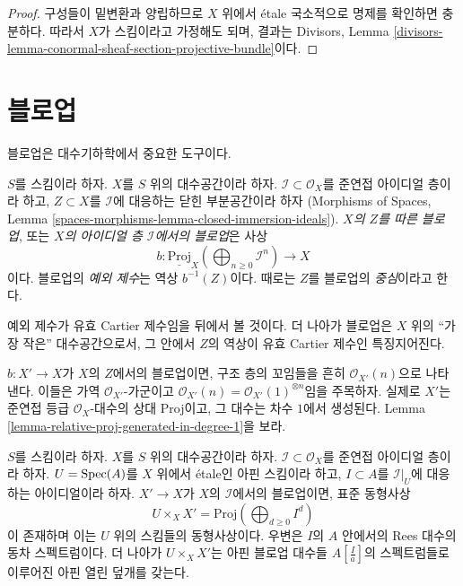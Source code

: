 \begin{proof}
구성들이 밑변환과 양립하므로 $X$ 위에서 \'etale 국소적으로 명제를
확인하면 충분하다. 따라서 $X$가 스킴이라고 가정해도 되며, 결과는
Divisors, Lemma
\ref{divisors-lemma-conormal-sheaf-section-projective-bundle}이다.
\end{proof}

\section{블로업}
\label{section-blowing-up}

\noindent
블로업은 대수기하학에서 중요한 도구이다.

\begin{definition}
\label{definition-blow-up}
$S$를 스킴이라 하자. $X$를 $S$ 위의 대수공간이라 하자.
$\mathcal{I} \subset \mathcal{O}_X$를 준연접 아이디얼 층이라 하고,
$Z \subset X$를 $\mathcal{I}$에 대응하는 닫힌 부분공간이라 하자
(Morphisms of Spaces, Lemma
\ref{spaces-morphisms-lemma-closed-immersion-ideals}).
{\it $X$의 $Z$를 따른 블로업}, 또는
{\it $X$의 아이디얼 층 $\mathcal{I}$에서의 블로업}은 사상
$$
b :
\underline{\text{Proj}}_X
\left(\bigoplus\nolimits_{n \geq 0} \mathcal{I}^n\right)
\longrightarrow
X
$$
이다. 블로업의 {\it 예외 제수}는 역상 $b^{-1}(Z)$이다. 때로는 $Z$를
블로업의 {\it 중심}이라고 한다.
\end{definition}

\noindent
예외 제수가 유효 Cartier 제수임을 뒤에서 볼 것이다. 더 나아가 블로업은
$X$ 위의 “가장 작은” 대수공간으로서, 그 안에서 $Z$의 역상이 유효 Cartier 제수인
특징지어진다.

\medskip\noindent
$b : X' \to X$가 $X$의 $Z$에서의 블로업이면, 구조 층의 꼬임들을 흔히
$\mathcal{O}_{X'}(n)$으로 나타낸다. 이들은 가역
$\mathcal{O}_{X'}$-가군이고
$\mathcal{O}_{X'}(n) = \mathcal{O}_{X'}(1)^{\otimes n}$임을 주목하자.
실제로 $X'$는 준연접 등급 $\mathcal{O}_X$-대수의 상대 Proj이고,
그 대수는 차수 $1$에서 생성된다. Lemma
\ref{lemma-relative-proj-generated-in-degree-1}을 보라.

\begin{lemma}
\label{lemma-blowing-up-affine}
$S$를 스킴이라 하자. $X$를 $S$ 위의 대수공간이라 하자.
$\mathcal{I} \subset \mathcal{O}_X$를 준연접 아이디얼 층이라 하자.
$U = \mathop{\mathrm{Spec}}(A)$를 $X$ 위에서 \'etale인 아핀 스킴이라 하고,
$I \subset A$를 $\mathcal{I}|_U$에 대응하는 아이디얼이라 하자.
$X' \to X$가 $X$의 $\mathcal{I}$에서의 블로업이면, 표준 동형사상
$$
U \times_X X' = \text{Proj}(\bigoplus\nolimits_{d \geq 0} I^d)
$$
이 존재하며 이는 $U$ 위의 스킴들의 동형사상이다. 우변은 $I$의 $A$ 안에서의
Rees 대수의 동차 스펙트럼이다.
더 나아가 $U \times_X X'$는 아핀 블로업 대수들
$A[\frac{I}{a}]$의 스펙트럼들로 이루어진 아핀 열린 덮개를 갖는다.
\end{lemma}

